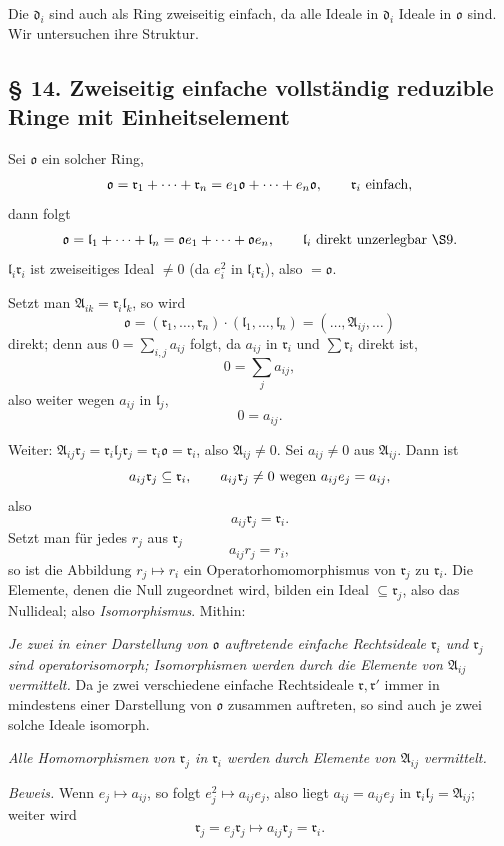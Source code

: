 \documentclass[11pt]{article}
\providecommand{\mA}{\mathfrak{A}}
\providecommand{\mo}{\mathfrak{o}}
\providecommand{\md}{\mathfrak{d}}
\providecommand{\ml}{\mathfrak{l}}
\providecommand{\mr}{\mathfrak{r}}
\begin{document}
Die $\md_i$ sind auch als Ring zweiseitig einfach, da alle Ideale in $\md_i$ Ideale in $\mo$ sind. Wir untersuchen ihre Struktur.

\subsection*{§ 14. Zweiseitig einfache vollständig reduzible Ringe mit Einheitselement}

Sei $\mo$ ein solcher Ring,
\[
        \mo=\mr_1+\cdots+\mr_n=e_1\mo+\cdots+e_n\mo,
        \qquad \mr_i\hbox{ einfach},
\]
dann folgt
\[
        \mo=\ml_1+\cdots+\ml_n=\mo e_1+\cdots+\mo e_n,
        \qquad \ml_i\hbox{ direkt unzerlegbar }\hbox{\(\S 9\)}.
\]
$\ml_i\mr_i$ ist zweiseitiges Ideal $\ne0$ (da $e_i^2$ in $\ml_i\mr_i$), also $=\mo$.

Setzt man $\mA_{ik}=\mr_i\ml_k$, so wird
\[
        \mo=(\mr_1,\ldots,\mr_n)\cdot(\ml_1,\ldots,\ml_n)
        = (\ldots,\mA_{ij},\ldots)
\]
direkt; denn aus $0=\sum_{i,j}a_{ij}$ folgt, da $a_{ij}$ in $\mr_i$ und $\sum\mr_i$ direkt ist,
\[
        0=\sum_j a_{ij},
\]
also weiter wegen $a_{ij}$ in $\ml_j$,
\[
        0=a_{ij}.
\]

Weiter: $\mA_{ij}\mr_j=\mr_i\ml_j\mr_j=\mr_i\mo=\mr_i$, also $\mA_{ij}\ne0$. Sei $a_{ij}\ne0$ aus $\mA_{ij}$. Dann ist
\[
        a_{ij}\mr_j\subseteq\mr_i,
        \qquad
        a_{ij}\mr_j\ne0 \hbox{ wegen } a_{ij}e_j=a_{ij},
\]
also
\[
        a_{ij}\mr_j=\mr_i.
\]
Setzt man für jedes $r_j$ aus $\mr_j$
\[
        a_{ij}r_j=r_i,
\]
so ist die Abbildung $r_j\mapsto r_i$ ein Operatorhomomorphismus von $\mr_j$ zu $\mr_i$. Die Elemente, denen die Null zugeordnet wird, bilden ein Ideal $\subseteq\mr_j$, also das Nullideal; also \emph{Isomorphismus}. Mithin:

\emph{Je zwei in einer Darstellung von $\mo$ auftretende einfache Rechtsideale $\mr_i$ und $\mr_j$ sind operatorisomorph; Isomorphismen werden durch die Elemente von $\mA_{ij}$ vermittelt.} Da je zwei verschiedene einfache Rechtsideale $\mr,\mr'$ immer in mindestens einer Darstellung von $\mo$ zusammen auftreten, so sind auch je zwei solche Ideale isomorph.

\emph{Alle Homomorphismen von $\mr_j$ in $\mr_i$ werden durch Elemente von $\mA_{ij}$ vermittelt.}

\emph{Beweis.} Wenn $e_j\mapsto a_{ij}$, so folgt $e_j^2\mapsto a_{ij}e_j$, also liegt $a_{ij}=a_{ij}e_j$ in $\mr_i\ml_j=\mA_{ij}$; weiter wird
\[
        \mr_j=e_j\mr_j\mapsto a_{ij}\mr_j=\mr_i.
\]
\end{document}
